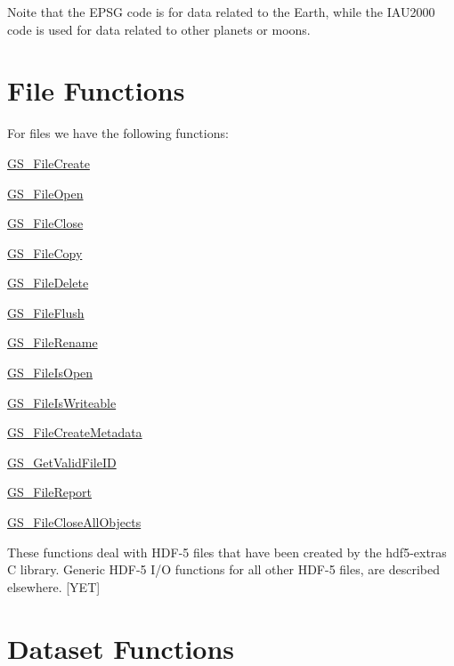 Noite that the E\+P\+S\+G code is for data related to the Earth, while the I\+A\+U2000 code is used for data related to other planets or moons.\hypertarget{hdf_library_hdf_file_functions}{}\section{File Functions}\label{hdf_library_hdf_file_functions}

For files we have the following functions\+: \begin{DoxyItemize}
\item \hyperlink{hdf5mine_8h_af07a914cd15aa25e3f6d92fe7ae005fa}{G\+S\+\_\+\+File\+Create} \item \hyperlink{hdf5mine_8h_ab917a3df2cea2e72a959d8e72d8b7f5d}{G\+S\+\_\+\+File\+Open} \item \hyperlink{hdf5mine_8h_a1e9f0a9400fffd99b282b1dd651fa63d}{G\+S\+\_\+\+File\+Close} \item \hyperlink{hdf5mine_8h_a27f03abbbf414b471cbe4ef8ebf17813}{G\+S\+\_\+\+File\+Copy} \item \hyperlink{hdf5mine_8h_a040861a90b5908480ad6a8d46ad0c9aa}{G\+S\+\_\+\+File\+Delete} \item \hyperlink{hdf5mine_8h_a8cd208fe090b959fe3142a3fc93cab14}{G\+S\+\_\+\+File\+Flush} \item \hyperlink{hdf5mine_8h_a10da9d7f59777a80a3aa6eb0fda3f3e0}{G\+S\+\_\+\+File\+Rename} \item \hyperlink{hdf5mine_8h_ac4f9a6f40f8d67b12bf70742f584ac70}{G\+S\+\_\+\+File\+Is\+Open} \item \hyperlink{hdf5mine_8h_aff67a8e73595be937141f2823f90ad9e}{G\+S\+\_\+\+File\+Is\+Writeable} \item \hyperlink{hdf5mine_8h_af6756c2c0e953c726dc7aa04172b5543}{G\+S\+\_\+\+File\+Create\+Metadata} \item \hyperlink{hdf5mine_8h_a99c937f579059c0ebea985ce6f61158f}{G\+S\+\_\+\+Get\+Valid\+File\+I\+D} \item \hyperlink{hdf5mine_8h_ac41b2acee4ded91a4f5adcbe49ca6549}{G\+S\+\_\+\+File\+Report} \item \hyperlink{hdf5mine_8h_abba9fbf0c3f0df085d9450411f214991}{G\+S\+\_\+\+File\+Close\+All\+Objects}\end{DoxyItemize}
These functions deal with H\+D\+F-\/5 files that have been created by the hdf5-\/extras C library. Generic H\+D\+F-\/5 I/\+O functions for all other H\+D\+F-\/5 files, are described elsewhere. \mbox{[}Y\+E\+T\mbox{]}\hypertarget{hdf_library_hdf_dataset_functions}{}\section{Dataset Functions}\label{hdf_library_hdf_dataset_functions}

